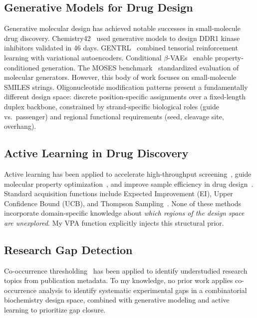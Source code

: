 \documentclass{article}
\begin{document}
\subsection{Generative Models for Drug Design}

Generative molecular design has achieved notable successes in small-molecule drug discovery. Chemistry42~\citep{zhavoronkov2019} used generative models to design DDR1 kinase inhibitors validated in 46 days. GENTRL~\citep{gentrl2019} combined tensorial reinforcement learning with variational autoencoders. Conditional $\beta$-VAEs~\citep{condvae2022, higgins2017} enable property-conditioned generation. The MOSES benchmark~\citep{moses2020} standardized evaluation of molecular generators. However, this body of work focuses on small-molecule SMILES strings. Oligonucleotide modification patterns present a fundamentally different design space: discrete position-specific assignments over a fixed-length duplex backbone, constrained by strand-specific biological roles (guide vs.\ passenger) and regional functional requirements (seed, cleavage site, overhang).

\subsection{Active Learning in Drug Discovery}

Active learning has been applied to accelerate high-throughput screening~\citep{graff2021}, guide molecular property optimization~\citep{reker2020}, and improve sample efficiency in drug design~\citep{bhatt2025}. Standard acquisition functions include Expected Improvement (EI), Upper Confidence Bound (UCB), and Thompson Sampling~\citep{snoek2012}. None of these methods incorporate domain-specific knowledge about \emph{which regions of the design space are unexplored}. My VPA function explicitly injects this structural prior.

\subsection{Research Gap Detection}

Co-occurrence thresholding~\citep{curiac2022} has been applied to identify understudied research topics from publication metadata. To my knowledge, no prior work applies co-occurrence analysis to identify systematic experimental gaps in a combinatorial biochemistry design space, combined with generative modeling and active learning to prioritize gap closure.
\end{document}
